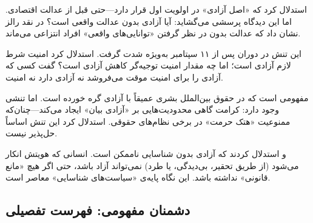 \begin{tcolorbox}[mybox, title={۲. عدالت و آزادی}]
 استدلال کرد که «اصل آزادی» در اولویت اول قرار دارد—حتی قبل از عدالت اقتصادی. اما این دیدگاه پرسشی می‌گشاید: آیا آزادی بدون عدالت واقعی است؟  در نقد رالز نشان داد که عدالت بدون در نظر گرفتن «توانایی‌های واقعی» افراد انتزاعی می‌ماند.
\end{tcolorbox}

\begin{tcolorbox}[mybox, title={۳. امنیت در برابر آزادی}]
این تنش در دوران پس از ۱۱ سپتامبر به‌ویژه شدت گرفت.  استدلال کرد امنیت شرط لازم آزادی است؛ اما چه مقدار امنیت توجیه‌گر کاهش آزادی است؟  گفت کسی که آزادی را برای امنیت موقت می‌فروشد نه آزادی دارد نه امنیت.
\end{tcolorbox}

\begin{tcolorbox}[mybox, title={۴. کرامت و آزادی}]
 مفهومی است که در حقوق بین‌الملل بشری عمیقاً با آزادی گره خورده است. اما تنشی وجود دارد: کرامت گاهی محدودیت‌هایی بر «آزادی بیان» ایجاد می‌کند—چنان‌که ممنوعیت «هتک حرمت» در برخی نظام‌های حقوقی.  استدلال کرد این تنش اساساً حل‌پذیر نیست.
\end{tcolorbox}

\begin{tcolorbox}[mybox, title={۵. شناسایی و آزادی}]
 و  استدلال کردند که آزادی بدون شناسایی ناممکن است. انسانی که هویتش انکار می‌شود (از طریق تحقیر، بی‌دیدگی، یا طرد) نمی‌تواند آزاد باشد، حتی اگر هیچ «مانع قانونی» نداشته باشد. این نگاه پایه‌ی «سیاست‌های شناسایی» معاصر است.
\end{tcolorbox}

\subsection{دشمنان مفهومی: فهرست تفصیلی}
\label{subsec:enemies_detail}

